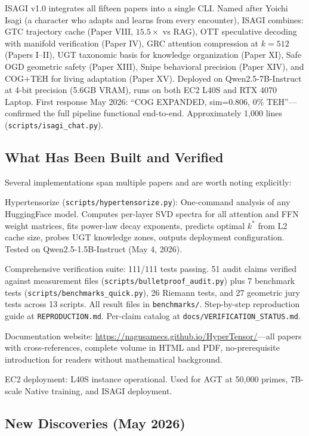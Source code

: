 \documentclass[11pt]{article}
\begin{document}
ISAGI v1.0 integrates all fifteen papers into a single CLI. Named after Yoichi Isagi (a character who adapts and learns from every encounter), ISAGI combines: GTC trajectory cache (Paper VIII, $15.5\times$ vs RAG), OTT speculative decoding with manifold verification (Paper IV), GRC attention compression at $k = 512$ (Papers I--II), UGT taxonomic basis for knowledge organization (Paper XI), Safe OGD geometric safety (Paper XIII), Snipe behavioral precision (Paper XIV), and COG+TEH for living adaptation (Paper XV). Deployed on Qwen2.5-7B-Instruct at 4-bit precision (5.6GB VRAM), runs on both EC2 L40S and RTX 4070 Laptop. First response May 2026: ``COG EXPANDED, sim=0.806, 0\% TEH''---confirmed the full pipeline functional end-to-end. Approximately 1,000 lines (\texttt{scripts/isagi\_chat.py}). \subsection*{What Has Been Built and Verified}

Several implementations span multiple papers and are worth noting explicitly:

Hypertensorize (\texttt{scripts/hypertensorize.py}): One-command analysis of any HuggingFace model. Computes per-layer SVD spectra for all attention and FFN weight matrices, fits power-law decay exponents, predicts optimal $k^*$ from L2 cache size, probes UGT knowledge zones, outputs deployment configuration. Tested on Qwen2.5-1.5B-Instruct (May 4, 2026).

Comprehensive verification suite: 111/111 tests passing. 51 audit claims verified against measurement files (\texttt{scripts/bulletproof\_audit.py}) plus 7 benchmark tests (\texttt{scripts/benchmarks\_quick.py}), 26 Riemann tests, and 27 geometric jury tests across 13 scripts. All result files in \texttt{benchmarks/}. Step-by-step reproduction guide at \texttt{REPRODUCTION.md}. Per-claim catalog at \texttt{docs/VERIFICATION\_STATUS.md}.

Documentation website: \url{https://nagusamecs.github.io/HyperTensor/}---all papers with cross-references, complete volume in HTML and PDF, no-prerequisite introduction for readers without mathematical background.

EC2 deployment: L40S instance operational. Used for AGT at 50,000 primes, 7B-scale Native training, and ISAGI deployment.

\subsection*{New Discoveries (May 2026)}
\end{document}
